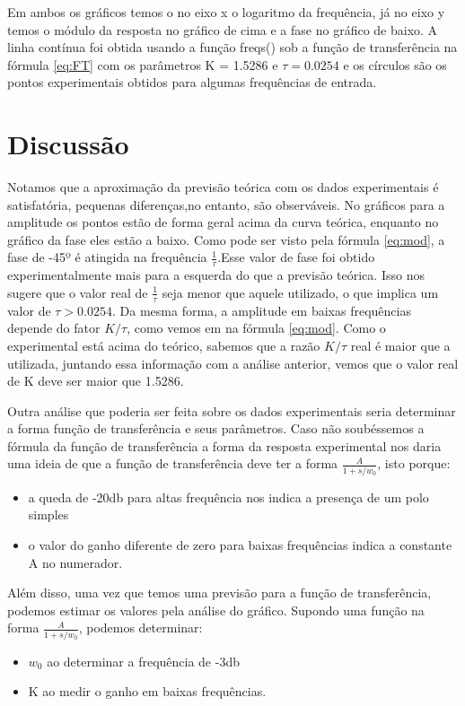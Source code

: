 \documentclass[journal]{IEEEtran}
\begin{document}
Em ambos os gráficos temos o no eixo x o logaritmo da frequência,
já no eixo y temos o módulo da resposta no gráfico de cima e a fase
no gráfico de baixo. A linha contínua foi obtida usando a função freqs()
sob a função de transferência na fórmula \ref{eq:FT} com os 
parâmetros K = 1.5286 e $\tau = 0.0254$
e os círculos são
os pontos experimentais obtidos para algumas frequências de entrada.
\section{Discussão}

Notamos que a aproximação da previsão teórica com os dados 
experimentais é
satisfatória, pequenas diferenças,no entanto, são observáveis. No 
gráficos para a amplitude os pontos estão de forma geral acima da
curva teórica, enquanto no gráfico da fase eles estão a baixo.
Como pode ser visto pela fórmula \ref{eq:mod}, a fase  de -45º 
é atingida na frequência $\frac{1}{\tau}$.Esse valor de fase foi
obtido experimentalmente mais para a esquerda do que a previsão 
teórica. Isso nos sugere que o valor real de $\frac{1}{\tau}$ seja 
menor que aquele utilizado, o que implica um valor de $\tau > 0.0254$.
Da mesma forma, a amplitude em baixas frequências depende do fator 
$K/\tau$, como vemos em na fórmula \ref{eq:mod}. Como o experimental 
está acima do teórico, sabemos que a razão $K/\tau$ real é maior que 
a utilizada, juntando essa informação
com a análise anterior, vemos que o valor real de K deve ser maior que
1.5286.

Outra análise que poderia ser feita sobre os dados experimentais seria
determinar a forma função de transferência e seus parâmetros. Caso 
não soubéssemos a fórmula da função de transferência a forma da 
resposta
experimental nos daria uma ideia de que a função de 
transferência deve ter a forma $\frac{A}{1 + s/w_0}$, isto porque:
\begin{itemize}
 \item a queda de -20db para altas frequência nos indica a presença 
de um polo simples
  \item o valor do ganho diferente de zero para baixas frequências
  indica a constante A no numerador.
\end{itemize}

Além disso, uma vez que temos uma previsão para a função de 
transferência, podemos estimar os valores pela análise do gráfico.
Supondo uma função na forma $\frac{A}{1 + s/w_0}$, podemos determinar:
\begin{itemize}
 \item $w_0$ ao determinar a frequência de -3db
 \item K ao medir o ganho em baixas frequências.
\end{itemize}
\end{document}
